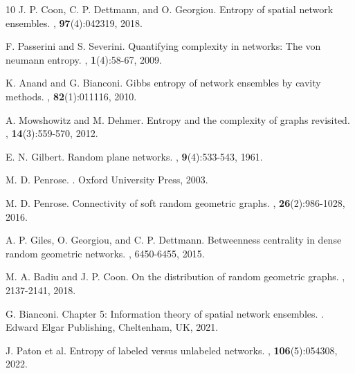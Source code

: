 \documentclass{article}
\begin{document}
\begin{thebibliography}{10}
    J. P. Coon, C. P. Dettmann, and O. Georgiou.
    \newblock Entropy of spatial network ensembles.
    , \textbf{97}(4):042319, 2018.
    
    F. Passerini and S. Severini.
    \newblock Quantifying complexity in networks: The von neumann entropy.
    , \textbf{1}(4):58-67, 2009.
    
    K. Anand and G. Bianconi.
    \newblock Gibbs entropy of network ensembles by cavity methods.
    , \textbf{82}(1):011116, 2010.
    
    A. Mowshowitz and M. Dehmer.
    \newblock Entropy and the complexity of graphs revisited.
    , \textbf{14}(3):559-570, 2012.
    
    E. N. Gilbert.
    \newblock Random plane networks.
    , \textbf{9}(4):533-543, 1961.
    
    M. D. Penrose.
    .
    \newblock Oxford University Press, 2003.
    
    M. D. Penrose.
    \newblock Connectivity of soft random geometric graphs.
    , \textbf{26}(2):986-1028, 2016.
    
    A. P. Giles, O. Georgiou, and C. P. Dettmann.
    \newblock Betweenness centrality in dense random geometric networks.
    , 6450-6455, 2015.
    
    M. A. Badiu and J. P. Coon.
    \newblock On the distribution of random geometric graphs.
    , 2137-2141, 2018.
    
    G. Bianconi.
    \newblock Chapter 5: Information theory of spatial network ensembles.
    . Edward Elgar Publishing, Cheltenham, UK, 2021.
    
    J. Paton et al.
    \newblock Entropy of labeled versus unlabeled networks.
    , \textbf{106}(5):054308, 2022.
    

\end{thebibliography}
\end{document}
